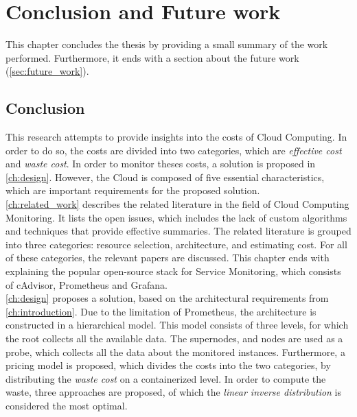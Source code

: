 \chapter{Conclusion and Future work}\label{ch:conclusion}
This chapter concludes the thesis by providing a small summary of the work performed. Furthermore, it ends with a section about the future work (\autoref{sec:future_work}).

\section{Conclusion}
This research attempts to provide insights into the costs of Cloud Computing. In order to do so, the costs are divided into two categories, which are \textit{effective cost} and \textit{waste cost}. In order to monitor theses costs, a solution is proposed in \autoref{ch:design}. However, the Cloud is composed of five essential characteristics, which are important requirements for the proposed solution.\\

\noindent
\autoref{ch:related_work} describes the related literature in the field of Cloud Computing Monitoring. It lists the open issues, which includes the lack of custom algorithms and techniques that provide effective summaries. The related literature is grouped into three categories: resource selection, architecture, and estimating cost. For all of these categories, the relevant papers are discussed. This chapter ends with explaining the popular open-source stack for Service Monitoring, which consists of cAdvisor, Prometheus and Grafana.\\

\noindent
\autoref{ch:design} proposes a solution, based on the architectural requirements from \autoref{ch:introduction}. Due to the limitation of Prometheus, the architecture is constructed in a hierarchical model. This model consists of three levels, for which the root collects all the available data. The supernodes, and nodes are used as a probe, which collects all the data about the monitored instances. Furthermore, a pricing model is proposed, which divides the costs into the two categories, by distributing the \textit{waste cost} on a containerized level. In order to compute the waste, three approaches are proposed, of which the \textit{linear inverse distribution} is considered the most optimal.\\

